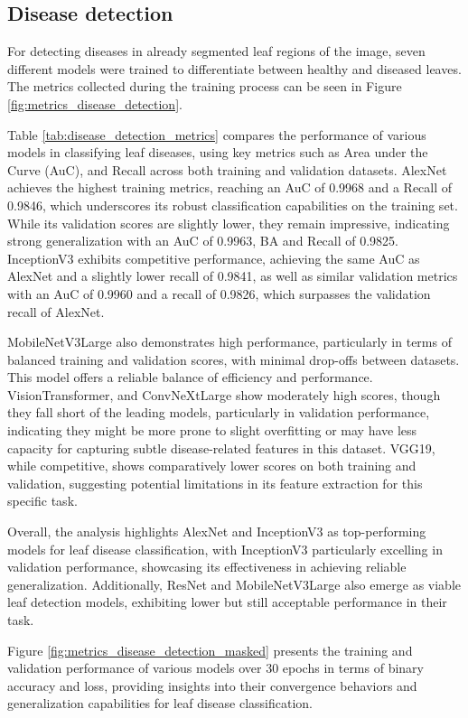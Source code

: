 \documentclass[draft,final]{vutinfth} %
\begin{document}
\begin{appendix}
\section{Disease detection} \label{sec:disease_detection_result_training}
For detecting diseases in already segmented leaf regions of the image, seven different models were trained to differentiate between healthy and diseased leaves. The metrics collected during the training process can be seen in Figure \ref{fig:metrics_disease_detection}.

Table \ref{tab:disease_detection_metrics} compares the performance of various models in classifying leaf diseases, using key metrics such as Area under the Curve (AuC), and Recall across both training and validation datasets. AlexNet achieves the highest training metrics, reaching an AuC of 0.9968 and a Recall of 0.9846, which underscores its robust classification capabilities on the training set. While its validation scores are slightly lower, they remain impressive, indicating strong generalization with an AuC of 0.9963, BA and Recall of 0.9825. InceptionV3 exhibits competitive performance, achieving the same AuC as AlexNet and a slightly lower recall of 0.9841, as well as similar validation metrics with an AuC of 0.9960 and a recall of 0.9826, which surpasses the validation recall of AlexNet.

MobileNetV3Large also demonstrates high performance, particularly in terms of balanced training and validation scores, with minimal drop-offs between datasets. This model offers a reliable balance of efficiency and performance. VisionTransformer, and ConvNeXtLarge show moderately high scores, though they fall short of the leading models, particularly in validation performance, indicating they might be more prone to slight overfitting or may have less capacity for capturing subtle disease-related features in this dataset. VGG19, while competitive, shows comparatively lower scores on both training and validation, suggesting potential limitations in its feature extraction for this specific task.

Overall, the analysis highlights AlexNet and InceptionV3 as top-performing models for leaf disease classification, with InceptionV3 particularly excelling in validation performance, showcasing its effectiveness in achieving reliable generalization. Additionally, ResNet and MobileNetV3Large also emerge as viable leaf detection models, exhibiting lower but still acceptable performance in their task. 

Figure \ref{fig:metrics_disease_detection_masked} presents the training and validation performance of various models over 30 epochs in terms of binary accuracy and loss, providing insights into their convergence behaviors and generalization capabilities for leaf disease classification.


\end{appendix}
\end{document}
